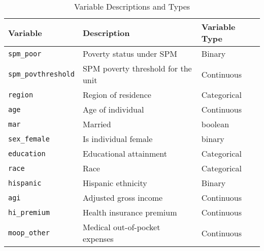 \begin{table}[ht]
\centering
\begin{tabular}{|l|p{7cm}|l|}
\hline
\textbf{Variable} & \textbf{Description} & \textbf{Variable Type} \\
\hline
\texttt{spm\_poor} & Poverty status under SPM & Binary \\
\texttt{spm\_povthreshold} & SPM poverty threshold for the unit & Continuous \\
\texttt{region} & Region of residence & Categorical \\
\texttt{age} & Age of individual & Continuous \\
\texttt{mar} & Married & boolean \\
\texttt{sex\_female} & Is individual female & binary \\
\texttt{education} & Educational attainment & Categorical \\
\texttt{race} & Race & Categorical \\
\texttt{hispanic} & Hispanic ethnicity & Binary \\
\texttt{agi} & Adjusted gross income & Continuous \\
\texttt{hi\_premium} & Health insurance premium & Continuous\\
\texttt{moop\_other} & Medical out-of-pocket expenses & Continuous \\
\hline
\end{tabular}
\caption{Variable Descriptions and Types}
\label{tab:variables}
\end{table}
